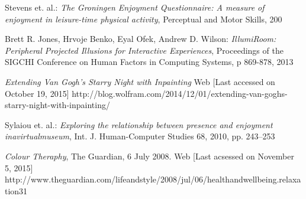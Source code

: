 \documentclass[a4paper]{article}
\begin{document}
\begin{thebibliography}{99}
 Stevens et. al.:
\emph{The Groningen Enjoyment Questionnaire: A measure of enjoyment in leisure-time physical activity},
Perceptual and Motor Skills, 200

 Brett R. Jones, Hrvoje Benko, Eyal Ofek, Andrew D. Wilson:
\emph{IllumiRoom: Peripheral Projected Illusions for
Interactive Experiences},
Proceedings of the SIGCHI Conference on Human Factors in Computing Systems, p 869-878, 2013

\emph{Extending Van Gogh’s \emph{Starry Night} with Inpainting}
Web [Last accessed on October 19, 2015]
http://blog.wolfram.com/2014/12/01/extending-van-goghs-starry-night-with-inpainting/

 Sylaiou et. al.:
\emph{Exploring the relationship between presence and enjoyment inavirtualmuseum},
Int. J. Human-Computer Studies 68, 2010, pp. 243--253

\emph{Colour Theraphy}, 
The Guardian, 6 July 2008.
Web [Last acsessed on November 5, 2015]
http://www.theguardian.com/lifeandstyle/2008/jul/06/healthandwellbeing.relaxation31


\end{thebibliography}
\end{document}
